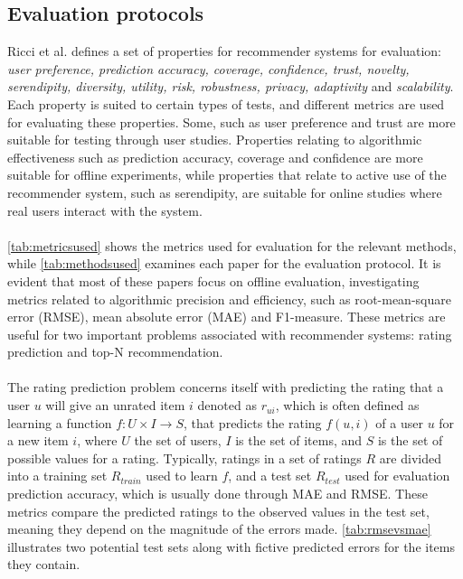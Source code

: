 \subsection{Evaluation protocols}\label{sec:evaluationmetrics}
Ricci et al.\cite{RecommenderHandbook2015} defines a set of properties for recommender systems for evaluation: \textit{user preference, prediction accuracy, coverage, confidence, trust, novelty, serendipity, diversity, utility, risk, robustness, privacy, adaptivity} and \textit{scalability}.
Each property is suited to certain types of tests, and different metrics are used for evaluating these properties.
Some, such as user preference and trust are more suitable for testing through user studies.
Properties relating to algorithmic effectiveness such as prediction accuracy, coverage and confidence are more suitable for offline experiments, while properties that relate to active use of the recommender system, such as serendipity, are suitable for online studies where real users interact with the system.
\\\\
\autoref{tab:metricsused} shows the metrics used for evaluation for the relevant methods, while \autoref{tab:methodsused} examines each paper for the evaluation protocol.
It is evident that most of these papers focus on offline evaluation, investigating metrics related to algorithmic precision and efficiency, such as root-mean-square error (RMSE), mean absolute error (MAE) and F1-measure.
These metrics are useful for two important problems associated with recommender systems: rating prediction and top-N recommendation\cite{RecommenderHandbook2015}.
\\\\
The rating prediction problem concerns itself with predicting the rating that a user $u$ will give an unrated item $i$ denoted as $r_{ui}$, which is often defined as learning a function $f : U \times I \rightarrow S$, that predicts the rating $f(u, i)$ of a user $u$ for a new item $i$, where $U$ the set of users, $I$ is the set of items, and $S$ is the set of possible values for a rating.
Typically, ratings in a set of ratings $R$ are divided into a training set $R_{train}$ used to learn $f$, and a test set $R_{test}$ used for evaluation prediction accuracy, which is usually done through MAE and RMSE.
These metrics compare the predicted ratings to the observed values in the test set, meaning they depend on the magnitude of the errors made.
\autoref{tab:rmsevsmae} illustrates two potential test sets along with fictive predicted errors for the items they contain.
